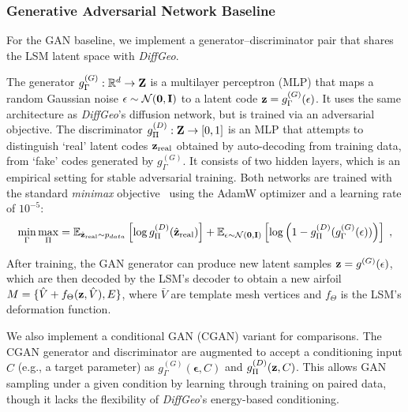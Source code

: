 \subsubsection{Generative Adversarial Network Baseline}
For the GAN baseline, we implement a generator–discriminator pair that shares the LSM latent space with \textit{DiffGeo}. 

The generator $g_{\Gamma}^{(G)}: \mathbb{R}^d \to \mathbf{Z}$ is a multilayer perceptron (MLP) that maps a random Gaussian noise $\epsilon \sim \mathcal{N}(\mathbf{0},\mathbf{I})$ to a latent code $\mathbf{z} = g^{(G)}_\Gamma(\mathbf{\epsilon})$. It uses the same architecture as \textit{DiffGeo}’s diffusion network, but is trained via an adversarial objective. The discriminator $g_{\Pi}^{(D)}: \mathbf{Z} \rightarrow [0,1]$ is an MLP that attempts to distinguish `real' latent codes $\mathbf{z}_{\text{real}}$ obtained by auto-decoding from training data, from `fake' codes generated by $g^{(G)}_\Gamma$. It consists of two hidden layers, which is an empirical setting for stable adversarial training. Both networks are trained with the standard \textit{minimax} objective~\cite{ai.Goodfellow2020} using the AdamW optimizer and a learning rate of $10^{-5}$:
\begin{equation}
    \min_\Gamma \max_\Pi = 
    \mathbb{E}_{\hat{\mathbf{z}}_\text{real} \sim p_{data}} \left[ \log g^{(D)}_\Pi(\hat{\mathbf{z}}_\text{real}) \right] + 
    \mathbb{E}_{\mathbf{\epsilon} \sim \mathcal{N}(\mathbf{0}, \mathbf{I})} \left[ \log \left( 1 - g^{(D)}_\Pi( g^{(G)}_\Gamma(\mathbf{\epsilon}) ) \right)\right]\;,
\end{equation}

After training, the GAN generator can produce new latent samples $\mathbf{z}=g^{(G)}(\mathbf{\epsilon})$, which are then decoded by the LSM’s decoder to obtain a new airfoil $M=\{\hat{V} + f_{\Theta}(\mathbf{z}, \hat{V}), E\}$, where $\bar{V}$ are template mesh vertices and $f_{\Theta}$ is the LSM's deformation function.

We also implement a conditional GAN (CGAN) variant for comparisons. The CGAN generator and discriminator are augmented to accept a conditioning input $C$ (e.g., a target parameter) as $g_{\Gamma}^{(G)}(\mathbf{\epsilon},C)$ and $g_{\Pi}^{(D)}(\mathbf{z},C)$. This allows GAN sampling under a given condition by learning through training on paired data, though it lacks the flexibility of \textit{DiffGeo}’s energy-based conditioning.

